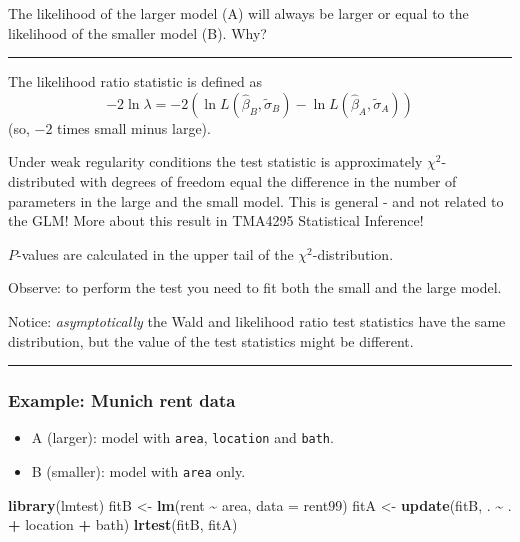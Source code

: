 \documentclass[
]{article}
\newenvironment{Shaded}{\begin{snugshade}}{\end{snugshade}}
\newcommand{\AttributeTok}[1]{\textcolor[rgb]{0.13,0.29,0.53}{#1}}
\newcommand{\FunctionTok}[1]{\textcolor[rgb]{0.13,0.29,0.53}{\textbf{#1}}}
\newcommand{\NormalTok}[1]{#1}
\newcommand{\OtherTok}[1]{\textcolor[rgb]{0.56,0.35,0.01}{#1}}
\newcommand{\SpecialCharTok}[1]{\textcolor[rgb]{0.81,0.36,0.00}{\textbf{#1}}}
\providecommand{\tightlist}{%
  \setlength{\itemsep}{0pt}\setlength{\parskip}{0pt}}
\begin{document}
The likelihood of the larger model (A) will always be larger or equal to
the likelihood of the smaller model (B). Why?

\begin{center}\rule{0.5\linewidth}{0.5pt}\end{center}

The likelihood ratio statistic is defined as
\[- 2\ln \lambda=-2(\ln L(\hat{\beta}_B,\tilde{\sigma}_B)-\ln L(\hat{\beta}_A,\tilde{\sigma}_A)) \]
(so, \(-2\) times small minus large).

Under weak regularity conditions the test statistic is approximately
\(\chi^2\)-distributed with degrees of freedom equal the difference in
the number of parameters in the large and the small model. This is
general - and not related to the GLM! More about this result in TMA4295
Statistical Inference!

\(P\)-values are calculated in the upper tail of the
\(\chi^2\)-distribution.

Observe: to perform the test you need to fit both the small and the
large model.

Notice: \emph{asymptotically} the Wald and likelihood ratio test
statistics have the same distribution, but the value of the test
statistics might be different.

\begin{center}\rule{0.5\linewidth}{0.5pt}\end{center}

\hypertarget{example-munich-rent-data}{%
\subsubsection{Example: Munich rent
data}\label{example-munich-rent-data}}

\begin{itemize}
\tightlist
\item
  A (larger): model with \texttt{area}, \texttt{location} and
  \texttt{bath}.
\item
  B (smaller): model with \texttt{area} only.
\end{itemize}

\begin{Shaded}
\begin{Highlighting}[]
\FunctionTok{library}\NormalTok{(lmtest)}
\NormalTok{fitB }\OtherTok{\textless{}{-}} \FunctionTok{lm}\NormalTok{(rent }\SpecialCharTok{\textasciitilde{}}\NormalTok{ area, }\AttributeTok{data =}\NormalTok{ rent99)}
\NormalTok{fitA }\OtherTok{\textless{}{-}} \FunctionTok{update}\NormalTok{(fitB, . }\SpecialCharTok{\textasciitilde{}}\NormalTok{ . }\SpecialCharTok{+}\NormalTok{ location }\SpecialCharTok{+}\NormalTok{ bath)}
\FunctionTok{lrtest}\NormalTok{(fitB, fitA)}
\end{Highlighting}
\end{Shaded}
\end{document}
